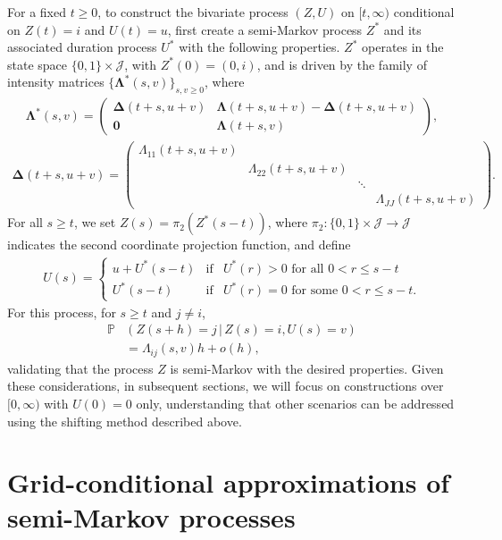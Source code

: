 \documentclass[11pt,leqno]{amsart}
\numberwithin{table}{section}
\numberwithin{figure}{section}
\numberwithin{equation}{section}
\newcommand{\1}{{\mathds{1}}}
\newcommand{\0}{\mat{0}}
\begin{document}
For a fixed $t\ge 0$, to construct the bivariate process $(Z,U)$ on $[t,\infty)$ conditional on $Z(t)=i$ and $U(t)=u$, first create a semi-Markov process $Z^*$ and its associated duration process $U^*$ with the following properties. $Z^*$ operates in the state space $\{0,1\}\times \mathcal{J}$, with $Z^*(0)=(0,i)$, and is driven by the family of intensity matrices $\{\bm{\Lambda}^*(s,v)\}_{s,v\ge 0}$, where 
\begin{align}\label{state_augmentation}
\bm{\Lambda}^*(s,v)  =\begin{pmatrix} \bm{\Delta}(t+s,u+v) & \bm{\Lambda}(t+s,u+v) - \bm{\Delta}(t+s,u+v)\\ \bm{0} & \bm{\Lambda}(t+s,v)\end{pmatrix},
\end{align}
\begin{align*}
\bm{\Delta}(t+s,u+v)=\begin{pmatrix}\Lambda_{11}(t+s, u+ v) &  & &\\ & \Lambda_{22}(t+s, u+ v)  & &\\ & &\ddots & \\ &&&\Lambda_{JJ}(t+s, u+ v)
\end{pmatrix}.\end{align*}
For all $s\ge t$, we set $Z(s)=\pi_2(Z^*(s-t))$, where $\pi_2: \{0,1\}\times \mathcal{J}\rightarrow \mathcal{J}$ indicates the second coordinate projection function, and define
\begin{align*}
U(s)= \left\{ \begin{array}{ccc} u+ U^*(s-t)& \text{if}& U^*(r) > 0 \text{ for all } 0<r\le s-t\\ U^*(s-t)& \text{if}& U^*(r) = 0 \text{ for some } 0<r\le s-t.\end{array}\right.
\end{align*}
For this process, for $s\ge t$ and $j\neq i$,
\begin{align*} 
\mathds{P}&\left(Z(s+h)=j\,|\, Z(s)=i, U(s)=v\right)\\
& = \Lambda_{ij}(s, v)h + o(h),
\end{align*}
validating that the process $Z$ is semi-Markov with the desired properties. 
Given these considerations, in subsequent sections, we will focus on constructions over $[0,\infty)$ with $U(0)=0$ only, understanding that other scenarios can be addressed using the shifting method described above.


\section{Grid-conditional approximations of semi-Markov processes}\label{sec:approxgen1}
\end{document}
